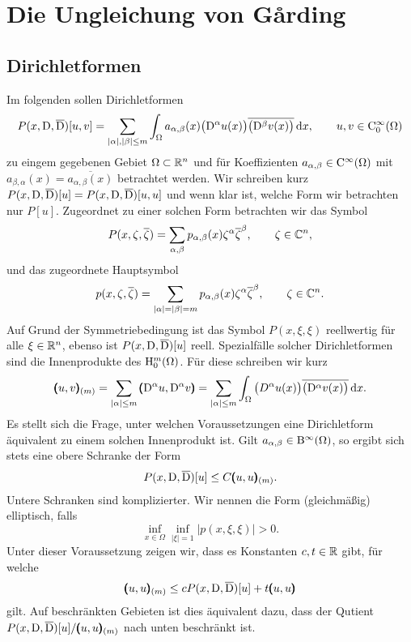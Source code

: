 \chapter{Die Ungleichung von G\r{a}rding}
\cite{Garding:1953}
\cite{Lax:1966}

\section{Dirichletformen}
Im folgenden sollen Dirichletformen 
\begin{equation}
   P(x,\mathrm D,\overline{\mathrm D})[u,v] = \sum_{|\alpha|,|\beta|\le m} \int_\Omega a_{\alpha,\beta}(x) \big(\mathrm D^\alpha u(x)\big) \overline{\big(\mathrm D^\beta v(x)\big)} \,\mathrm d x,\qquad u,v\in\mathrm C_0^\infty(\Omega)
\end{equation}
zu eingem gegebenen Gebiet $\Omega\subset\mathbb R^n$ und für Koeffizienten $a_{\alpha,\beta}\in\mathrm C^\infty(\Omega)$ mit $a_{\beta,\alpha}(x)=\overline{a_{\alpha,\beta}(x)}$  betrachtet werden. Wir schreiben kurz $P(x,\mathrm D,\overline{\mathrm D})[u]=P(x,\mathrm D,\overline{\mathrm D})[u,u]$ und wenn klar ist, welche Form wir betrachten nur $P[u]$. Zugeordnet zu einer solchen Form betrachten wir das Symbol
\begin{equation}
   P(x,\zeta,\overline\zeta) = \sum_{\alpha,\beta} p_{\alpha,\beta}(x) \zeta^\alpha\overline\zeta^\beta,\qquad \zeta\in\mathbb C^n,
\end{equation}
und das zugeordnete Hauptsymbol
\begin{equation}
   p(x,\zeta,\overline\zeta) = \sum_{|\alpha|=|\beta|=m} p_{\alpha,\beta}(x) \zeta^\alpha\overline\zeta^\beta,\qquad \zeta\in\mathbb C^n.
\end{equation}
Auf Grund der Symmetriebedingung ist das Symbol $P(x,\xi,\xi)$ reellwertig f\"ur alle $\xi\in\mathbb R^n$, ebenso ist 
$P(x,\mathrm D,\overline {\mathrm D})[u]$ reell. Spezialfälle solcher Dirichletformen sind die Innenprodukte des $\mathrm H^m_0(\Omega)$. Für diese schreiben wir kurz
\begin{equation}
  \pmb(u,v\pmb)_{(m)} = \sum_{|\alpha|\le m} \pmb(\mathrm D^\alpha u,\mathrm D^\alpha v\pmb) = \sum_{|\alpha|\le m} \int_\Omega   \big(D^\alpha u(x)\big) \overline{\big(\mathrm D^\alpha v(x)\big)} \,\mathrm d x.
\end{equation}
Es stellt sich die Frage, unter welchen Voraussetzungen eine Dirichletform äquivalent zu einem solchen Innenprodukt ist. Gilt $a_{\alpha,\beta}\in \mathrm B^\infty(\Omega)$, so ergibt sich stets eine obere Schranke der Form
\begin{equation}
    P(x,\mathrm D,\overline{\mathrm D})[u] \le C \pmb(u,u\pmb)_{(m)}.
\end{equation}
Untere Schranken sind komplizierter. Wir nennen die Form (gleichmäßig) elliptisch, falls 
\begin{equation}
  \inf_{x\in\Omega}  \inf_{|\xi|=1} |p(x,\xi,\xi)| > 0.
\end{equation}
Unter dieser Voraussetzung zeigen wir, dass es Konstanten $c,t\in\mathbb R$ gibt, für welche
\begin{equation} 
   \pmb(u,u\pmb)_{(m)} \le c P(x,\mathrm D,\overline {\mathrm D}) [u] + t \pmb(u,u\pmb)
\end{equation}
gilt. Auf beschränkten Gebieten ist dies äquivalent dazu, dass der Qutient $P(x,\mathrm D,\overline {\mathrm D}) [u]  / \pmb(u,u\pmb)_{(m)}$ nach unten beschränkt ist.


